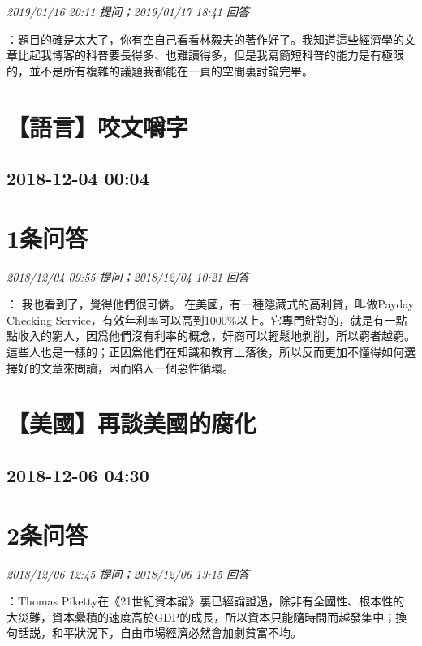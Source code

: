 \documentclass[twocolumn]{ctexart}
\begin{document}
\textit{\hfill\noindent\small 2019/01/16 20:11 提问；2019/01/17 18:41 回答}

：題目的確是太大了，你有空自己看看林毅夫的著作好了。我知道這些經濟學的文章比起我博客的科普要長得多、也難讀得多，但是我寫簡短科普的能力是有極限的，並不是所有複雜的議題我都能在一頁的空間裏討論完畢。
\\


\section{【語言】咬文嚼字}
\subsection{2018-12-04 00:04}


\section{1条问答}

\textit{\hfill\noindent\small 2018/12/04 09:55 提问；2018/12/04 10:21 回答}

：
我也看到了，覺得他們很可憐。
在美國，有一種隱藏式的高利貸，叫做Payday Checking Service，有效年利率可以高到1000\%以上。它專門針對的，就是有一點點收入的窮人，因爲他們沒有利率的概念，奸商可以輕鬆地剝削，所以窮者越窮。
這些人也是一樣的；正因爲他們在知識和教育上落後，所以反而更加不懂得如何選擇好的文章來閲讀，因而陷入一個惡性循環。
\\


\section{【美國】再談美國的腐化}
\subsection{2018-12-06 04:30}


\section{2条问答}

\textit{\hfill\noindent\small 2018/12/06 12:45 提问；2018/12/06 13:15 回答}

：Thomas Piketty在《21世紀資本論》裏已經論證過，除非有全國性、根本性的大災難，資本纍積的速度高於GDP的成長，所以資本只能隨時間而越發集中；換句話説，和平狀況下，自由市場經濟必然會加劇貧富不均。
\\
\end{document}
